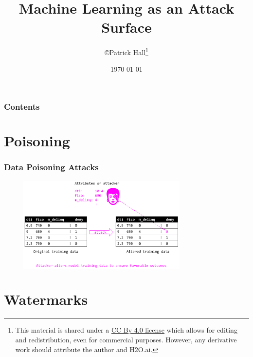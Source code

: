 \documentclass[11pt,
               aspectratio=169,
               hyperref={colorlinks}
               ]{beamer}
\author{\copyright\hspace{1pt}Patrick Hall\footnote{\tiny{This material is shared under a \href{https://creativecommons.org/licenses/by/4.0/deed.ast}{CC By 4.0 license} which allows for editing and redistribution, even for commercial purposes. However, any derivative work should attribute the author and H2O.ai.}}}
\title{Machine Learning as an Attack Surface}
\institute{\href{https://www.h2o.ai}{H\textsubscript{2}O.ai}}
\date{\today}
\begin{document}
	
	\maketitle
	
	\begin{frame}
	
		\frametitle{Contents}
		
		\tableofcontents{}
		
	\end{frame}

	\section{Poisoning}
	
		\begin{frame}
		
			\frametitle{Data Poisoning Attacks}		
			
			\begin{figure}[htb]
				\begin{center}
					\includegraphics[height=135pt]{img/poison.png}
				\end{center}
			\end{figure}	

		
		\end{frame}
		
	\section{Watermarks}
	
\end{document}
